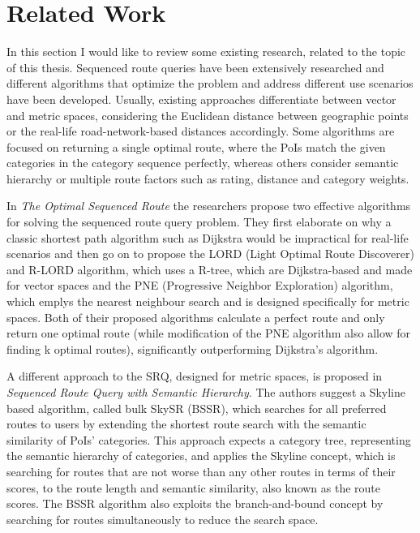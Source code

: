 \chapter{Related Work}
\label{sec:relwork}
In this section I would like to review some existing research, related to the topic of this thesis. Sequenced route queries have been extensively researched and different algorithms that optimize the problem and address different use scenarios have been developed. Usually, existing approaches differentiate between vector and metric spaces, considering the Euclidean distance between geographic points or the real-life road-network-based distances accordingly. Some algorithms are focused on returning a single optimal route, where the PoIs match the given categories in the category sequence perfectly, whereas others consider semantic hierarchy or multiple route factors such as rating, distance and category weights. 

In \textit{The Optimal Sequenced Route} the researchers propose two effective algorithms for solving the sequenced route query problem. They first elaborate on why a classic shortest path algorithm such as Dijkstra would be impractical for real-life scenarios and then go on to propose the LORD (Light Optimal Route Discoverer) and R-LORD algorithm, which uses a R-tree, which are Dijkstra-based and made for vector spaces and the PNE (Progressive Neighbor Exploration) algorithm, which emplys the nearest neighbour search and is designed specifically for metric spaces. Both of their proposed algorithms calculate a perfect route and only return one optimal route (while modification of the PNE algorithm also allow for finding k optimal routes), significantly outperforming Dijkstra's algorithm. \cite{OSR}

A different approach to the SRQ, designed for metric spaces, is proposed in \textit{Sequenced Route Query with Semantic Hierarchy}. The authors suggest a Skyline based algorithm, called bulk SkySR (BSSR), which searches for all preferred routes to users by extending the shortest route search with the semantic similarity of PoIs' categories. This approach expects a category tree, representing the semantic hierarchy of categories, and applies the Skyline concept, which is searching for routes that are not worse than any other routes in terms of their scores, to the route length and semantic similarity, also known as the route scores. The BSSR algorithm also exploits the branch-and-bound concept by searching for routes simultaneously to reduce the search space. \cite{semanticSRQ}

